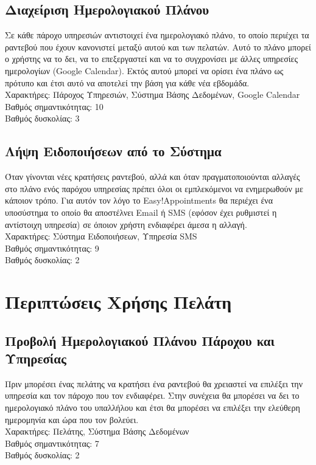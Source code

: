 \documentclass[12pt]{article}
\begin{document}
\subsection{Διαχείριση Ημερολογιακού Πλάνου}
Σε κάθε πάροχο υπηρεσιών αντιστοιχεί ένα ημερολογιακό πλάνο, το οποίο περιέχει τα ραντεβού που έχουν κανονιστεί μεταξύ αυτού και των πελατών. Αυτό το πλάνο μπορεί ο χρήστης να το δει, να το επεξεργαστεί και να το συγχρονίσει με άλλες υπηρεσίες ημερολογίων (Google Calendar). Εκτός αυτού μπορεί να ορίσει ένα πλάνο ως πρότυπο και έτσι αυτό να αποτελεί την βάση για κάθε νέα εβδομάδα.
\\[0.3cm] 
Χαρακτήρες: Πάροχος Υπηρεσιών, Σύστημα Βάσης Δεδομένων, Google Calendar
\\[0.3cm]
Βαθμός σημαντικότητας: 10
\\[0.3cm]
Βαθμός δυσκολίας: 3

\subsection{Λήψη Ειδοποιήσεων από το Σύστημα}
Όταν γίνονται νέες κρατήσεις ραντεβού, αλλά και όταν πραγματοποιούνται αλλαγές στο πλάνο ενός παρόχου υπηρεσίας πρέπει όλοι οι εμπλεκόμενοι να ενημερωθούν με κάποιον τρόπο. Για αυτόν τον λόγο το Easy!Appointments θα περιέχει ένα υποσύστημα το οποίο θα αποστέλνει Email ή SMS (εφόσον έχει ρυθμιστεί η αντίστοιχη υπηρεσία) σε όποιον χρήστη ενδιαφέρει άμεσα η αλλαγή.
\\[0.3cm] 
Χαρακτήρες: Σύστημα Ειδοποιήσεων, Υπηρεσία SMS
\\[0.3cm]
Βαθμός σημαντικότητας: 9
\\[0.3cm]
Βαθμός δυσκολίας: 2

\section {Περιπτώσεις Χρήσης Πελάτη}
\subsection{Προβολή Ημερολογιακού Πλάνου Πάροχου και Υπηρεσίας}
Πριν μπορέσει ένας πελάτης να κρατήσει ένα ραντεβού θα χρειαστεί να επιλέξει την υπηρεσία και τον πάροχο που τον ενδιαφέρει. Στην συνέχεια θα μπορέσει να δει το ημερολογιακό πλάνο του υπαλλήλου και έτσι θα μπορέσει να επιλέξει την ελεύθερη ημερομηνία και ώρα που τον βολεύει.
\\[0.3cm] 
Χαρακτήρες: Πελάτης, Σύστημα Βάσης Δεδομένων
\\[0.3cm]
Βαθμός σημαντικότητας: 7
\\[0.3cm]
Βαθμός δυσκολίας: 2 
\end{document}
